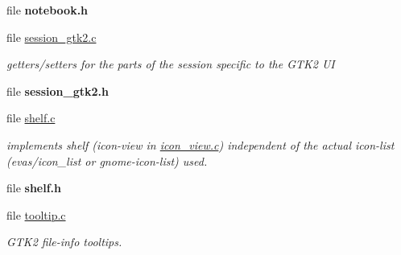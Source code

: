 \begin{CompactItemize}
\item 
file {\bf notebook.h}
\item 
file \hyperlink{session__gtk2_8c}{session\_\-gtk2.c}
\begin{CompactList}\small\item\em getters/setters for the parts of the session specific to the GTK2 UI \item\end{CompactList}

\item 
file {\bf session\_\-gtk2.h}
\item 
file \hyperlink{shelf_8c}{shelf.c}
\begin{CompactList}\small\item\em implements shelf (icon-view in \hyperlink{icon__view_8c}{icon\_\-view.c}) independent of the actual icon-list (evas/icon\_\-list or gnome-icon-list) used. \item\end{CompactList}

\item 
file {\bf shelf.h}
\item 
file \hyperlink{tooltip_8c}{tooltip.c}
\begin{CompactList}\small\item\em GTK2 file-info tooltips. \item\end{CompactList}

\end{CompactItemize}
